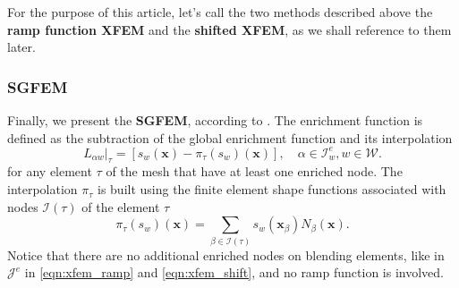 \documentclass{elsarticle}
\def\vc#1{\mathbf{\boldsymbol{#1}}}     %
\newcommand{\bx}{\vc{x}}
\begin{document}
For the purpose of this article, let's call the two methods described above the \textbf{ramp function XFEM}  
and the \textbf{shifted XFEM}, as we shall reference to them later.

\subsubsection{SGFEM}
Finally, we present the \textbf{SGFEM}, according to \cite{babuska_stable_2012,gupta_stable_2013}. 
The enrichment function is defined as the subtraction of the global enrichment function and its interpolation 
\begin{equation} \label{eqn:sgfem_enrich}
    L_{\alpha w}|_{\tau} = \left[s_w(\bx) - \pi_\tau (s_w)(\bx)\right],
    \quad \alpha\in\mathcal{I}^e_w, w\in\mathcal{W}.
\end{equation} 
for any element $\tau$ of the mesh that have at least one enriched node.
The interpolation $\pi_\tau$ is built using the finite element shape functions
associated with nodes $\mathcal{I}(\tau)$ of the element $\tau$
\begin{equation} \label{eqn:sgfem_interpolation}
    \pi_\tau (s_w)(\bx) = \sum\limits_{\beta\in\mathcal{I}(\tau)} s_w(\bx_\beta) N_\beta(\bx).
\end{equation}
Notice that there are no additional enriched nodes on blending elements, like in $\mathcal{J}^e$ in 
\eqref{eqn:xfem_ramp} and \eqref{eqn:xfem_shift}, and no ramp function is involved.
\end{document}
